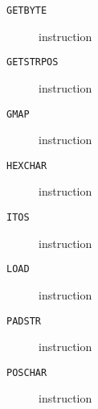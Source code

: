 \clearpage
\begin{description}
\item[\texttt{GETBYTE}] instruction\\

\end{description}
\clearpage
\begin{description}
\item[\texttt{GETSTRPOS}] instruction\\

\end{description}
\clearpage
\begin{description}
\item[\texttt{GMAP}] instruction\\

\end{description}
\clearpage
\begin{description}
\item[\texttt{HEXCHAR}] instruction\\

\end{description}
\clearpage
\begin{description}
\item[\texttt{ITOS}] instruction\\

\end{description}
\clearpage
\begin{description}
\item[\texttt{LOAD}] instruction\\

\end{description}
\clearpage
\begin{description}
\item[\texttt{PADSTR}] instruction\\

\end{description}
\clearpage
\begin{description}
\item[\texttt{POSCHAR}] instruction\\

\end{description}
